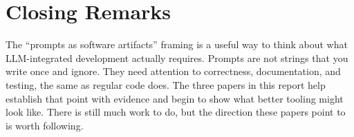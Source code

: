 \documentclass[
    pdftex,
    final,
    11pt,
    a4paper,
    parskip=false,
    oneside,
    footheight=0mm,
    footinclude=false,
    toc=bibliography
]{scrbook}
\begin{document}
\section{Closing Remarks}

The ``prompts as software artifacts'' framing is a useful way to think about what LLM-integrated development actually requires. Prompts are not strings that you write once and ignore. They need attention to correctness, documentation, and testing, the same as regular code does. The three papers in this report help establish that point with evidence and begin to show what better tooling might look like. There is still much work to do, but the direction these papers point to is worth following.





\backmatter
\end{document}
